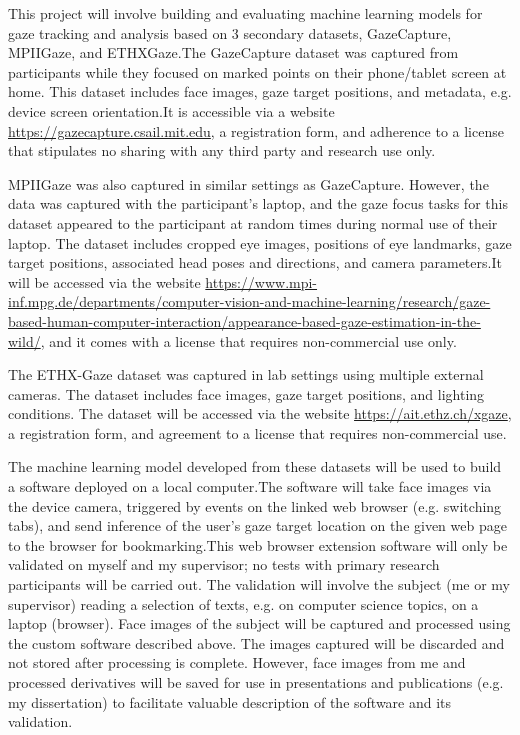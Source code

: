 \documentclass[twocolumn]{report}
\begin{document}
This project will involve building and evaluating machine learning models for gaze tracking and analysis based on 3 secondary datasets, GazeCapture, MPIIGaze, and ETHXGaze.The GazeCapture \cite{krafka2016eye} dataset was captured from participants while they focused on marked points on their phone/tablet screen at home. This dataset includes face images, gaze target positions, and metadata, e.g. device screen orientation.It is accessible via a website \url{https://gazecapture.csail.mit.edu}, a registration form, and adherence to a license that stipulates no sharing with any third party and research use only.

MPIIGaze \cite{zhang15cvpr} was also captured in similar settings as GazeCapture. However, the data was captured with the participant's laptop, and the gaze focus tasks for this dataset appeared to the participant at random times during normal use of their laptop. The dataset includes cropped eye images, positions of eye landmarks, gaze target positions, associated head poses and directions, and camera parameters.It will be accessed via the website \url{https://www.mpi-inf.mpg.de/departments/computer-vision-and-machine-learning/research/gaze-based-human-computer-interaction/appearance-based-gaze-estimation-in-the-wild/}, and it comes with a license that requires non-commercial use only.

The ETHX-Gaze dataset \cite{zhang2020ethxgaze} was captured in lab settings using multiple external cameras. The dataset includes face images, gaze target positions, and lighting conditions. The dataset will be accessed via the website \url{https://ait.ethz.ch/xgaze}, a registration form, and agreement to a license that requires non-commercial use.

The machine learning model developed from these datasets will be used to build a software deployed on a local computer.The software will take face images via the device camera, triggered by events on the linked web browser (e.g. switching tabs), and send inference of the user's gaze target location on the given web page to the browser for bookmarking.This web browser extension software will only be validated on myself and my supervisor; no tests with primary research participants will be carried out. The validation will involve the subject (me or my supervisor) reading a selection of texts, e.g. on computer science topics, on a laptop (browser). Face images of the subject will be captured and processed using the custom software described above. The images captured will be discarded and not stored after processing is complete. However, face images from me and processed derivatives will be saved for use in presentations and publications (e.g. my dissertation) to facilitate valuable description of the software and its validation.
\end{document}
